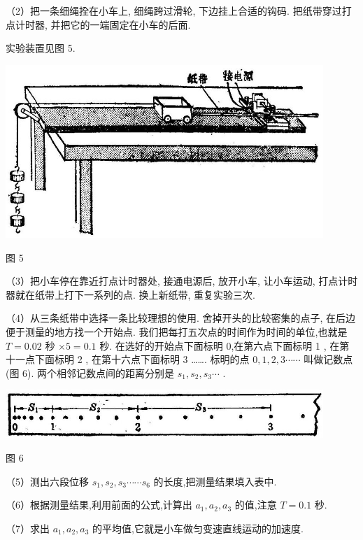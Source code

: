 \documentclass[10pt]{article}
\begin{document}
（2）把一条细绳拴在小车上, 细绳跨过滑轮, 下边挂上合适的钩码. 把纸带穿过打点计时器, 并把它的一端固定在小车的后面.

实验装置见图 5.

\begin{center}
\includegraphics[max width=0.9\textwidth]{images/01912d55-147c-70aa-b0e0-1782a122f948_321_561793.jpg}
\end{center}

图 5

（3）把小车停在靠近打点计时器处, 接通电源后, 放开小车, 让小车运动, 打点计时器就在纸带上打下一系列的点. 换上新纸带, 重复实验三次.

（4）从三条纸带中选择一条比较理想的使用. 舍掉开头的比较密集的点子, 在后边便于测量的地方找一个开始点. 我们把每打五次点的时间作为时间的单位,也就是 \(T = {0.02}\) 秒 \(\times 5 = {0.1}\) 秒. 在选好的开始点下面标明 0,在第六点下面标明 1 , 在第十一点下面标明 2 , 在第十六点下面标明 3 ……. 标明的点 \(0,1,2,3\cdots \cdots\) 叫做记数点 (图 6). 两个相邻记数点间的距离分别是 \({s}_{1},{s}_{2},{s}_{3}\cdots\) .

\begin{center}
\includegraphics[max width=0.9\textwidth]{images/01912d55-147c-70aa-b0e0-1782a122f948_321_631477.jpg}
\end{center}

图 6

（5）测出六段位移 \({s}_{1},{s}_{2},{s}_{3}\cdots \cdots {s}_{6}\) 的长度,把测量结果填入表中.

（6）根据测量结果,利用前面的公式,计算出 \({a}_{1},{a}_{2},{a}_{3}\) 的值,注意 \(T = {0.1}\) 秒.

（7）求出 \({a}_{1},{a}_{2},{a}_{3}\) 的平均值,它就是小车做匀变速直线运动的加速度.
\end{document}
